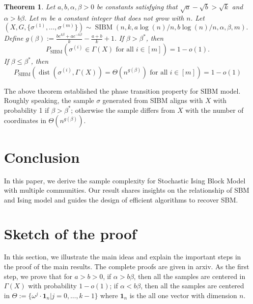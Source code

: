 \documentclass[conference]{IEEEtran}
\newtheorem{theorem}{Theorem}%
\DeclareMathOperator{\SIBM}{SIBM}
\DeclareMathOperator{\dist}{dist}
\begin{document}
\begin{theorem}  \label{thm:wt3}
Let $a,b,\alpha,\beta> 0$ be constants satisfying that $\sqrt{a}-\sqrt{b} > \sqrt{k}$ and $\alpha>b\beta$. Let $m$ be a constant integer that does not grow with $n$.
Let 
$
(X,G,\{\sigma^{(1)},\dots,\sigma^{(m)}\}) \sim \SIBM(n,k, a\log(n)/n, b\log(n)/n,\alpha,\beta,m).
$
Define $g(\beta)  := \frac{b e^{k\beta}+a e^{-k\beta}}{k}-\frac{a+b}{k}+1$.
If $\beta>\beta^\ast$, then
$$
P_{\SIBM}(\sigma^{(i)} \in \Gamma(X) \text{~for all~} i\in[m]) = 1-o(1).
$$
If $\beta\le \beta^\ast$, then
$$
P_{\SIBM}(\dist(\sigma^{(i)}, \Gamma(X))= \Theta(n^{g(\beta)}) \text{~for all~} i\in[m]) = 1-o(1)
$$
\end{theorem}

The above theorem established the phase transition property for SIBM model.
Roughly speaking, the sample $\sigma$ generated from SIBM aligns with $X$ with probability 1 if $\beta > \beta^*$;
otherwise the sample differs from $X$ with the number of coordinates in $\Theta(n^{g(\beta)})$.

\section{Conclusion}\label{s:conclusion}
In this paper, we derive the sample complexity for Stochastic Ising Block Model with multiple communities.
Our result shares insights on the relationship of SBM and Ising model and guides the design of efficient algorithms
to recover SBM.
\appendix
\section{Sketch of the proof}
\label{sect:sketch}

In this section, we illustrate the main ideas and explain the important steps in the proof of the main results.
The complete proofs are given in arxiv.
As the first step, we prove that for $a>b>0$, if $\alpha>b\beta$, then all the samples are centered in $\Gamma(X)$ with probability $1-o(1)$;
if $\alpha<b\beta$, then all the samples are centered in $\Theta := \{ \omega^j  \cdot \mathbf{1}_n | j=0, \dots,k-1\}$
where $\mathbf{1}_n$ is the all one vector with dimension $n$.
\end{document}
